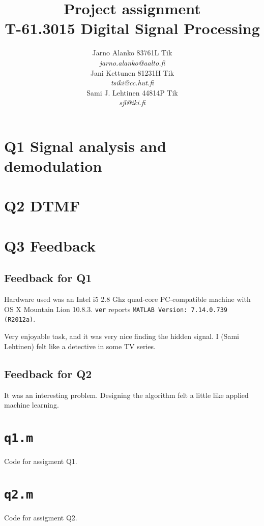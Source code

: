 \documentclass[a4paper]{article}
\begin{document}
\title{Project assignment \\
T-61.3015 Digital Signal Processing}
\author{Jarno Alanko 83761L Tik \\
  {\it jarno.alanko@aalto.fi} \\
  Jani Kettunen 81231H Tik \\
  {\it tsiki@cc.hut.fi} \\
  Sami J. Lehtinen 44814P Tik \\ 
       {\it sjl@iki.fi}}

\maketitle             
\thispagestyle{empty}
\newpage
{}
\setcounter{page}{2}

\section*{Q1 Signal analysis and demodulation }


\section*{Q2 DTMF}


\section*{Q3 Feedback}
\subsection{Feedback for Q1}
Hardware used was an Intel i5 2.8 Ghz quad-core PC-compatible machine
with OS X Mountain Lion 10.8.3.  {\tt ver} reports 
{\tt MATLAB Version: 7.14.0.739 (R2012a)}.

Very enjoyable task, and it was very nice finding the hidden signal.  I
(Sami Lehtinen) felt like a detective in some TV series.

\subsection{Feedback for Q2}

It was an interesting problem. Designing the algorithm felt a little
like applied machine learning.

\clearpage




\newpage
\appendix
\section{{\tt q1.m}}
\label{sect:q1m}
Code for assigment Q1.



\newpage
\section{{\tt q2.m}}
\label{sect:q2m}
Code for assigment Q2.


\end{document}
